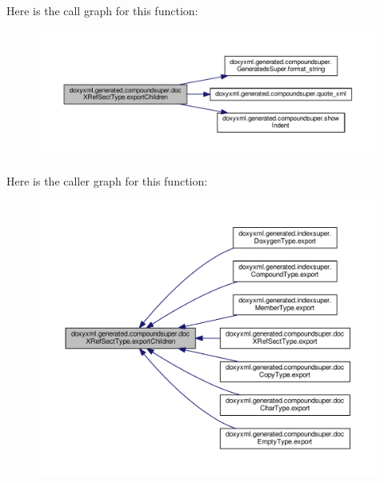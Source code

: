 Here is the call graph for this function\+:
\nopagebreak
\begin{figure}[H]
\begin{center}
\leavevmode
\includegraphics[width=350pt]{d3/d61/classdoxyxml_1_1generated_1_1compoundsuper_1_1docXRefSectType_a4b4228f258b8663d472ae86216b3f976_cgraph}
\end{center}
\end{figure}




Here is the caller graph for this function\+:
\nopagebreak
\begin{figure}[H]
\begin{center}
\leavevmode
\includegraphics[width=350pt]{d3/d61/classdoxyxml_1_1generated_1_1compoundsuper_1_1docXRefSectType_a4b4228f258b8663d472ae86216b3f976_icgraph}
\end{center}
\end{figure}


